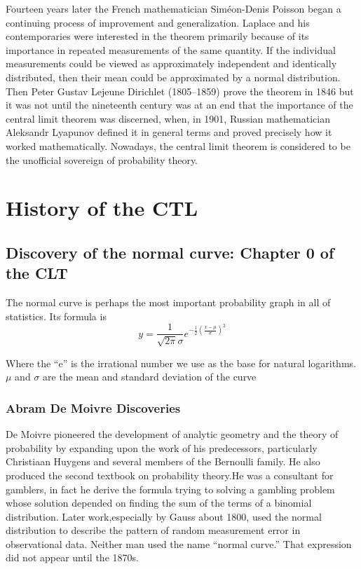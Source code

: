 \documentclass{article}
\begin{document}
Fourteen years later the French mathematician Siméon-Denis Poisson began a continuing process of improvement and generalization.
Laplace and his contemporaries were interested in the theorem primarily because of its importance in repeated measurements of the same quantity. If the individual measurements could be viewed as approximately independent and identically distributed, then their mean could be approximated by a normal distribution.
Then Peter Gustav Lejeune Dirichlet (1805–1859) prove the theorem in 1846
but it was not until the nineteenth century was at an end that the importance of the central limit theorem was discerned, when, in 1901, Russian mathematician Aleksandr Lyapunov defined it in general terms and proved precisely how it worked mathematically.
Nowadays, the central limit theorem is considered to be the unofficial sovereign of probability theory.


\section{History of the CTL }

\subsection{Discovery of the normal curve: Chapter 0 of the CLT}
The normal curve is perhaps the most important probability graph in all of statistics.
Its formula is 
\[  y=\frac{1}{\sqrt{2\pi}\sigma}e^{-\frac{1}{2}(\frac{x-\mu}{\sigma})^2  }   \]

 Where the  “e”  is the irrational number we use as the base for natural logarithms. $ \mu $ and $ \sigma $ are
the mean and standard deviation of the curve

\subsubsection{Abram De Moivre Discoveries}
De Moivre pioneered the development of analytic geometry and the theory of probability by expanding upon the work of his predecessors, particularly Christiaan Huygens and several members of the Bernoulli family. He also produced the second textbook on probability theory.He was a consultant for  gamblers, in fact he derive the formula trying to  solving a gambling
problem whose solution depended on finding the sum of the terms of a binomial distribution. Later work,especially by Gauss about 1800, used the normal distribution to describe the pattern of random
measurement error in observational data. Neither man used the name “normal curve.” That expression did not appear until the 1870s.
\end{document}
